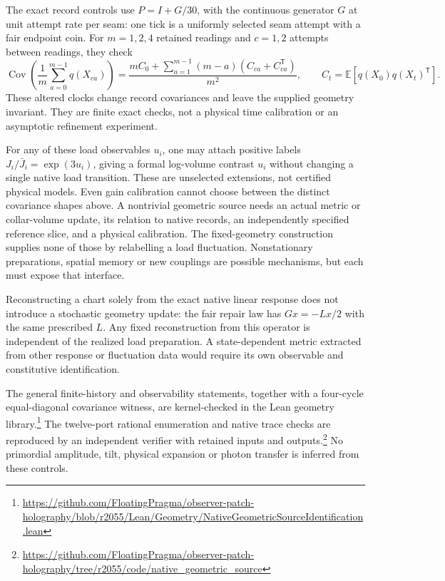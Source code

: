 The exact record controls use \(P=I+G/30\), with the continuous
generator \(G\) at unit attempt rate per seam: one tick is a uniformly selected
seam attempt with a fair endpoint coin. For \(m=1,2,4\) retained readings
and \(c=1,2\) attempts between readings, they check
\[
 \operatorname{Cov}\!\left(\frac1m\sum_{a=0}^{m-1}q(X_{ca})\right)
 =\frac{mC_0+\sum_{a=1}^{m-1}(m-a)(C_{ca}+C_{ca}^{\mathsf T})}{m^2},
 \qquad C_t=\mathbb E[q(X_0)q(X_t)^{\mathsf T}].
\]
These altered clocks change record covariances and leave the supplied
geometry invariant. They are finite exact checks, not a physical time
calibration or an asymptotic refinement experiment.

For any of these load observables \(u_i\), one may attach positive labels
\(J_i/\bar J_i=\exp(3u_i)\), giving a formal log-volume contrast \(u_i\)
without changing a single native load transition. These are unselected
extensions, not certified physical models. Even gain calibration cannot
choose between the distinct covariance shapes above. A nontrivial geometric
source needs an actual metric or collar-volume update, its relation to native
records, an independently specified reference slice, and a physical
calibration. The fixed-geometry construction supplies none of those by
relabelling a load fluctuation. Nonstationary preparations, spatial memory or
new couplings are possible mechanisms, but each must expose that interface.

Reconstructing a chart solely from the exact native linear response does
not introduce a stochastic geometry update: the fair repair law has
\(Gx=-Lx/2\) with the same prescribed \(L\). Any fixed reconstruction
from this operator is independent of the realized load preparation. A
state-dependent metric extracted from other response or fluctuation data
would require its own observable and constitutive identification.

The general finite-history and observability statements, together with a
four-cycle equal-diagonal covariance witness, are kernel-checked in the Lean
geometry library.\footnote{\url{https://github.com/FloatingPragma/observer-patch-holography/blob/r2055/Lean/Geometry/NativeGeometricSourceIdentification.lean}}
The twelve-port rational enumeration and native trace checks are reproduced
by an independent verifier with retained inputs and
outputs.\footnote{\url{https://github.com/FloatingPragma/observer-patch-holography/tree/r2055/code/native_geometric_source}} No primordial amplitude,
tilt, physical expansion or photon transfer is inferred from these controls.
